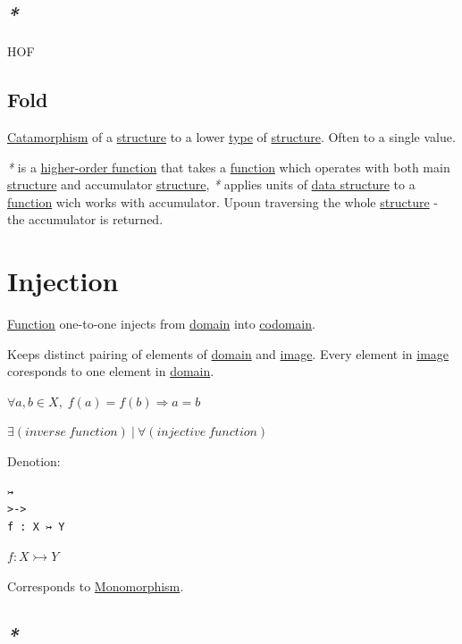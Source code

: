 \documentclass[a4paper,14pt,oneside]{book}
\begin{document}
\subsection{\emph{*}}
\label{sec:org0801ca2}

\label{orgdbdec57}HOF

\subsection{\label{org620059f}Fold}
\label{sec:orgaa0ccdb}
\hyperref[org11e005e]{Catamorphism} of a \hyperref[org2f3ef45]{structure} to a lower \hyperref[org1eff537]{type} of \hyperref[org2f3ef45]{structure}. Often to a single value.

\emph{*} is a \hyperref[org1146033]{higher-order function} that takes a \hyperref[org679af45]{function} which operates with both main \hyperref[org2f3ef45]{structure} and accumulator \hyperref[org2f3ef45]{structure}, \emph{*} applies units of \hyperref[org527bcbb]{data structure} to a \hyperref[org679af45]{function} wich works with accumulator. Upoun traversing the whole \hyperref[org2f3ef45]{structure} - the accumulator is returned.

\section{\label{orgd6a54bc}Injection}
\label{sec:orgb1cd76b}
\hyperref[org679af45]{Function} one-to-one injects from \hyperref[orgd3b5c7f]{domain} into \hyperref[org5ec3963]{codomain}.

Keeps distinct pairing of elements of \hyperref[orgd3b5c7f]{domain} and \hyperref[orgcf22927]{image}.
Every element in \hyperref[orgcf22927]{image} coresponds to one element in \hyperref[orgd3b5c7f]{domain}.

\(\forall a,b \in X, \; f(a)=f(b) \Rightarrow a=b\)

\(\exists (inverse \ function) \ | \ \forall (injective \ function)\)

Denotion:
\begin{verbatim}
↣
>->
f : X ↣ Y
\end{verbatim}
\(f : X \rightarrowtail Y\)

Corresponds to \hyperref[org51ecaf8]{Monomorphism}.

\subsection{\emph{*}}
\label{sec:orgd60d7db}
\end{document}
